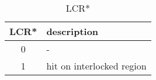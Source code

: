 %
%
\begin{table}[htbp]
\caption{LCR*}\label{tbl:lcr}
   \begin{center}
   \begin{tabular}{|c|l|} \hline
      LCR* & description \\ \hline \hline
      0    & - \\ \hline
      1    & hit on interlocked region \\ \hline
   \end{tabular}
   \end{center}
\end{table}
%
%

